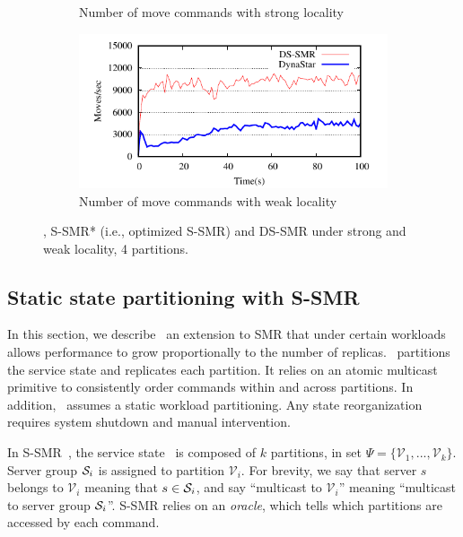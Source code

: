 \begin{figure}[ht!]
\begin{subfigure}[b]{0.45\textwidth}
  \caption{Number of move commands with strong locality}
  \end{subfigure}
  \begin{subfigure}[b]{0.45\textwidth}
    \centering
    \includegraphics[width=0.95\columnwidth]{figures/experiments/dynastar/socc-moves-weak-locality}
    \caption{Number of move commands with weak locality}
  \end{subfigure}
  \caption{\dynastar, S-SMR* (i.e., optimized S-SMR) and DS-SMR under strong and weak locality, 4 partitions.}
  \label{fig:motivation}
\end{figure}

\subsection{Static state partitioning with S-SMR}
\label{sec:ssmr}

In this section, we describe \ssmr\, an extension to SMR that under certain
workloads allows performance to grow proportionally to the number of replicas.
\ssmr\ partitions the service state and replicates each partition. It relies on
an atomic multicast primitive to consistently order commands within and across
partitions. In addition, \ssmr\ assumes a static workload partitioning. Any
state reorganization requires system shutdown and manual intervention.

In S-SMR~\cite{bezerra2014ssmr}, the service state \vvt\ is composed of $k$
partitions, in set $\Psi = \{\mathcal{V}_1, ..., \mathcal{V}_k\}$. Server group
$\mathcal{S}_i$ is assigned to partition $\mathcal{V}_i$. For brevity, we say that
server $s$ belongs to $\mathcal{V}_i$ meaning that $s \in \mathcal{S}_i$, and say
``multicast to $\mathcal{V}_i$'' meaning ``multicast to server group $\mathcal{S}_i$''.
S-SMR relies on an \emph{oracle}, which tells which partitions are accessed by
each command.



